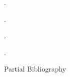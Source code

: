 \documentclass[beamer,10pt]{standalone}
\begin{document}
\begin{frame}
 .
\end{frame}

\begin{frame}
 .
\end{frame}

\begin{frame}
 .
\end{frame}
\begin{frame}
 .
\end{frame}














\ifstandalone
\begin{frame}[t,allowframebreaks]{Partial Bibliography}
	\nocite{Miti2021}
	
	
\end{frame}
\fi



\end{document}
